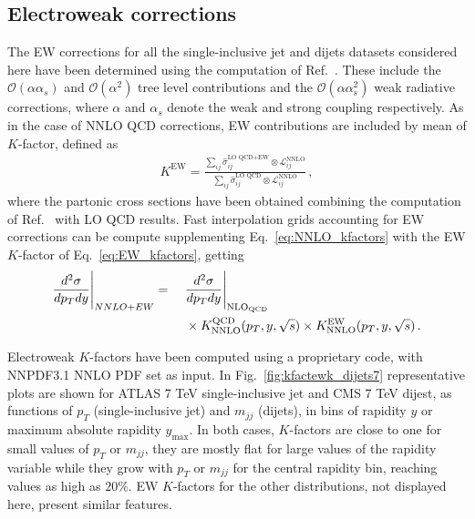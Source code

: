 \subsection{Electroweak corrections}
The EW corrections for all the single-inclusive jet and dijets datasets considered here have been determined 
using the computation of Ref.~\cite{Dittmaier:2012kx}.
These include the $\mathcal{O}\left(\alpha\alpha_s\right)$ and $\mathcal{O}\left(\alpha^2\right)$ tree level contributions 
and the $\mathcal{O}\left(\alpha\alpha_s^2\right)$ weak radiative corrections, where $\alpha$ and $\alpha_s$
denote the weak and strong coupling respectively.
As in the case of NNLO QCD corrections, EW contributions are included by mean of $K$-factor, defined as
\begin{align}
    \label{eq:EW_kfactors}
    K^{\text{EW}} = \frac{\sum_{ij}\hat{\sigma}_{ij}^{\text{LO QCD}+\text{EW}}\otimes \mathcal{L}_{ij}^{\text{NNLO}}}
    {\sum_{ij}\hat{\sigma}_{ij}^{\text{LO QCD}}\otimes \mathcal{L}_{ij}^{\text{NNLO}}}\,,
\end{align}
where the partonic cross sections have been obtained combining the computation of Ref.~\cite{Dittmaier:2012kx} 
with LO QCD results.
Fast interpolation grids accounting for EW corrections can be compute
supplementing Eq.~\eqref{eq:NNLO_kfactors} with the EW $K$-factor of Eq.~\eqref{eq:EW_kfactors}, getting
\begin{align}
    \label{eq:NNLO_EW_kfactors}
    \frac{d^2\sigma}{dp_T dy}\Bigg|_{NNLO+EW} =\,\,\,\,\,\,\,\, &\frac{d^2\sigma}{dp_T dy} 
    \Bigg|_{\rm NLO_{QCD}} \nonumber\\ &\times K_{\rm NNLO}^{\rm QCD}(p_T,y,\sqrt{s})
    \times K_{\rm NNLO}^{\rm EW}(p_T,y,\sqrt{s})\,.
\end{align}

Electroweak $K$-factors have been computed using a proprietary code, with NNPDF3.1 NNLO PDF set as input.
In Fig.~\ref{fig:kfactewk_dijets7} representative plots are shown for ATLAS 7 TeV single-inclusive jet and CMS 7 TeV dijest,
as functions of $p_T$ (single-inclusive jet) and $m_{jj}$ (dijets), in bins of rapidity $y$
or maximum absolute rapidity $y_{\text{max}}$. In both cases, $K$-factors are close to one for small
values of $p_T$ or $m_{jj}$, they are mostly flat for large values of the rapidity variable while 
they grow with $p_T$ or $m_{jj}$  for the central rapidity bin, reaching values as high as $20\%$.
EW $K$-factors for the other distributions, not displayed here, present similar features.


